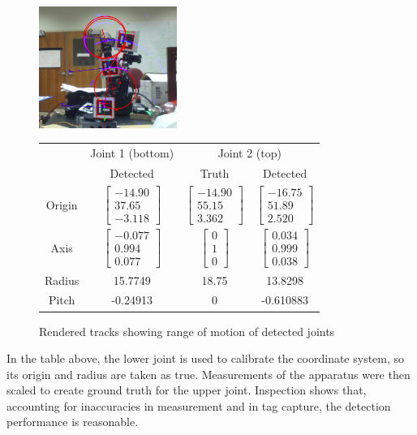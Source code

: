 \documentclass[letterpaper, 10 pt, conference]{ieeeconf}  %
\newcommand\mat[2]{\ensuremath{\left[\begin{array}{#1}#2\end{array}\right]}}
\begin{document}
\begin{figure}[ht]
  \centering
  \includegraphics[width=0.4\textwidth]{img/omgcircles.png}
  \footnotesize
  \begin{tabular}{c|c|c|c}
    & \multicolumn{1}{c}{Joint 1 (bottom)} & \multicolumn{2}{|c}{Joint 2 (top)} \\
    & Detected    & Truth   & Detected    \\ \hline
    Origin & $\mat{c}{-14.90 \\ 37.65 \\ -3.118}$ & $\mat{c}{-14.90 \\ 55.15 \\ 3.362}$ & $\mat{c}{-16.75 \\ 51.89 \\ 2.520}$ \\
    Axis   & $\mat{c}{-0.077 \\ 0.994 \\ 0.077}$ & $\mat{c}{0 \\ 1 \\ 0}$ & $\mat{c}{0.034 \\ 0.999 \\ 0.038}$ \\
    Radius & 15.7749      & 18.75           & 13.8298      \\
    Pitch  & -0.24913      & 0           & -0.610883      \\
  \end{tabular}
  \caption{Rendered tracks showing range of motion of detected joints}
  \label{fig:results}
\end{figure}

In the table above, the lower joint is used to calibrate the coordinate system, so its origin and radius are taken as true. Measurements of the apparatus were then scaled to create ground truth for the upper joint. Inspection shows that, accounting for inaccuracies in measurement and in tag capture, the detection performance is reasonable.
\end{document}
